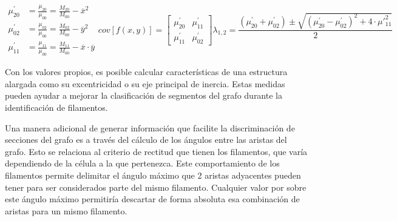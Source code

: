 \begin{subequations}
\begin{align}
    \mu_{20}^{\prime} &= \frac{\mu_{20}}{\mu_{00}} = \frac{M_{20}}{M_{00}} - \overline{x}^{2} \label{eq:mu20} \\
    \mu_{02}^{\prime} &= \frac{\mu_{02}}{\mu_{00}} = \frac{M_{02}}{M_{00}} - \overline{y}^{2} \label{eq:mu02} \\
    \mu_{11}^{\prime} &= \frac{\mu_{11}}{\mu_{00}} = \frac{M_{11}}{M_{00}} - \overline{x}\cdot\overline{y} \label{eq:mu11}
\end{align}

\begin{equation}
    \label{eq:covMatLambda}
    cov[f(x,y)] = \begin{bmatrix}
        \mu_{20}^{\prime} & \mu_{11}^{\prime} \\
        \mu_{11}^{\prime} & \mu_{02}^{\prime} 
        \end{bmatrix}
\end{equation}

\begin{equation}
    \label{eq:lambdaMoments}
    \lambda_{1,2} = \dfrac{(\mu_{20}^{\prime} + \mu_{02}^{\prime}) \pm \sqrt{(\mu_{20}^{\prime} - \mu_{02}^{\prime})^{2} + 4\cdot \mu\prime_{11}^{2} }}{2}
\end{equation}
\end{subequations}

Con los valores propios, es posible calcular caracter\'isticas de una estructura alargada como su excentricidad o su eje principal de inercia. Estas medidas pueden ayudar a mejorar la clasificaci\'on de segmentos del grafo durante la identificaci\'on de filamentos.


Una manera adicional de generar informaci\'on que facilite la discriminaci\'on de secciones del grafo es a trav\'es del c\'alculo de los \'angulos entre las aristas del grafo. Esto se relaciona al criterio de rectitud que tienen los filamentos, que var\'ia dependiendo de la c\'elula a la que pertenezca. Este comportamiento de los filamentos permite delimitar el \'angulo m\'aximo que 2 aristas adyacentes pueden tener para ser considerados parte del mismo filamento. Cualquier valor por sobre este \'angulo m\'aximo permitir\'ia descartar de forma absoluta esa combinaci\'on de aristas para un mismo filamento. 



